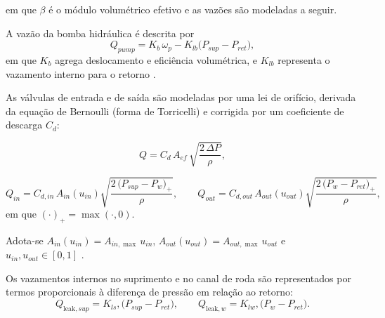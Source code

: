 em que $\beta$ é o módulo volumétrico efetivo e as vazões são modeladas a seguir.

A vazão da bomba hidráulica é descrita por
\begin{equation}
    Q_{pump} = K_b\,\omega_p - K_{lb}\big(P_{sup}-P_{ret}\big),
    \label{eq:qpump_2p}
\end{equation}
em que $K_b$ agrega deslocamento e eficiência volumétrica, e $K_{lb}$ representa o vazamento interno para o retorno \cite{MotorParametricDesign2023,WangBingbing2015}.

As válvulas de entrada e de saída são modeladas por uma lei de orifício, derivada da equação de Bernoulli (forma de Torricelli) e corrigida por um coeficiente de descarga $C_d$:

\begin{equation}
    Q = C_d\,A_{ef}\,\sqrt{\frac{2\,\Delta P}{\rho}},
    \label{eq:lei-orificio}
\end{equation}

\begin{equation}
    Q_{in} = C_{d,in}\,A_{in}(u_{in})\sqrt{\frac{2\,\big(P_{sup}-P_w\big)_{+}}{\rho}},
    \qquad
    Q_{out} = C_{d,out}\,A_{out}(u_{out})\sqrt{\frac{2\,\big(P_{w}-P_{ret}\big)_{+}}{\rho}},
    \label{eq:qin_qout}
\end{equation}
em que $(\cdot)_{+}=\max(\cdot,0)$.

Adota-se $A_{in}(u_{in}) = A_{in,\max}\,u_{in}$, $A_{out}(u_{out}) = A_{out,\max}\,u_{out}$ e $u_{in},u_{out}\in[0,1]$ \cite{ProportionalPressureABS2023,Lv2014,ChenLv2017}.

Os vazamentos internos no suprimento e no canal de roda são representados por termos proporcionais à diferença de pressão em relação ao retorno:
\begin{equation}
    Q_{\text{leak},sup} = K_{ls},\big(P_{sup}-P_{ret}\big),
    \qquad
    Q_{\text{leak},w} = K_{lw},\big(P_{w}-P_{ret}\big).
    \label{eq:leaks}
\end{equation}















